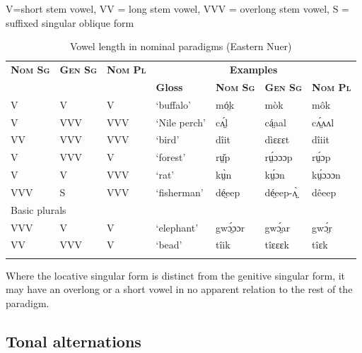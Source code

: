 \documentclass[output=paper,newtxmath,modfonts,nonflat]{langsci/langscibook}
\begin{document}
\begin{table}
V=short stem vowel, VV = long stem vowel, VVV = overlong stem vowel, S = suffixed singular oblique form
\begin{tabularx}{\textwidth}{lllXlll}
\lsptoprule

\bfseries\scshape Nom Sg & \bfseries\scshape Gen Sg & \bfseries\scshape Nom Pl & \multicolumn{4}{c}{\bfseries Examples}\\
\cmidrule{4-7}
&  &  & \bfseries Gloss & \bfseries\scshape Nom Sg & \bfseries\scshape Gen Sg & \bfseries\scshape Nom Pl\\
\midrule
V & V & V & ‘buffalo’ & mó̤k & mòk & môk\\
V & VVV & VVV & ‘Nile perch’ & cʌ̤́l  & cá̤aal & cʌ̤́ʌʌl\\
VV & VVV & VVV & ‘bird’ & dîit & dìɛɛɛt & dîiit\\
V & VVV & V & ‘forest’ & rṳ̌p & rṳ́ɔɔɔp & rṳ́ɔp\\
V & V & VVV & ‘rat’ & kṳ̀n & kṳ́ɔn & kṳ́ɔɔɔn\\
VVV & S & VVV & ‘fisherman’ & dé̤eep & dé̤eep-ʌ̤̤̀ & dêeep\\
\midrule
\multicolumn{7}{l}{Basic plurals}\\
\midrule
VVV & V & V & ‘elephant’ & gwɔ̤́ɔɔr & gwɔ̤́ar & gwɔ̤́r\\
VV & VVV & V & ‘bead’ & tîik & tîɛɛɛk & tîɛk\\
\lspbottomrule
\end{tabularx}
\caption{Vowel length in nominal paradigms (Eastern Nuer)}
\label{tab:monich:20}
\end{table}
Where the locative singular form is distinct from the genitive singular form, it may have an overlong or a short vowel in no apparent relation to the rest of the paradigm.

\subsection{Tonal alternations}
\end{document}
